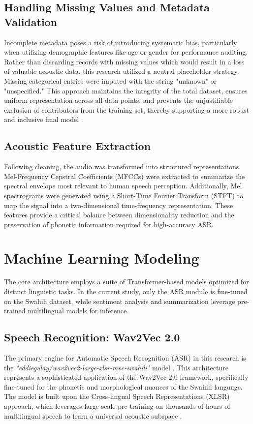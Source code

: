 \subsection{Handling Missing Values and Metadata Validation}
Incomplete metadata poses a risk of introducing systematic bias, particularly when utilizing demographic features like age or gender for performance auditing. Rather than discarding records with missing values which would result in a loss of valuable acoustic data, this research utilized a neutral placeholder strategy. Missing categorical entries were imputed with the string "unknown" or "unspecified." This approach maintains the integrity of the total dataset, ensures uniform representation across all data points, and prevents the unjustifiable exclusion of contributors from the training set, thereby supporting a more robust and inclusive final model \citep{Nganga_Maroko_Ong_onda_2023}.

\subsection{Acoustic Feature Extraction}
Following cleaning, the audio was transformed into structured representations. Mel-Frequency Cepstral Coefficients (MFCCs) were extracted to summarize the spectral envelope most relevant to human speech perception. Additionally, Mel spectrograms were generated using a Short-Time Fourier Transform (STFT) to map the signal into a two-dimensional time-frequency representation. These features provide a critical balance between dimensionality reduction and the preservation of phonetic information required for high-accuracy ASR.

\section{Machine Learning Modeling}

The core architecture employs a suite of Transformer-based models optimized for distinct linguistic tasks. In the current study, only the ASR module is fine-tuned on the Swahili dataset, while sentiment analysis and summarization leverage pre-trained multilingual models for inference.

\subsection{Speech Recognition: Wav2Vec 2.0}
The primary engine for Automatic Speech Recognition (ASR) in this research is the \textit{"eddiegulay/wav2vec2-large-xlsr-mvc-swahili"} model \citep{eddiegulay2021wav2vec2}. This architecture represents a sophisticated application of the Wav2Vec 2.0 framework, specifically fine-tuned for the phonetic and morphological nuances of the Swahili language. The model is built upon the Cross-lingual Speech Representations (XLSR) approach, which leverages large-scale pre-training on thousands of hours of multilingual speech to learn a universal acoustic subspace \citep{baevski2020wav2vec20frameworkselfsupervised}.

